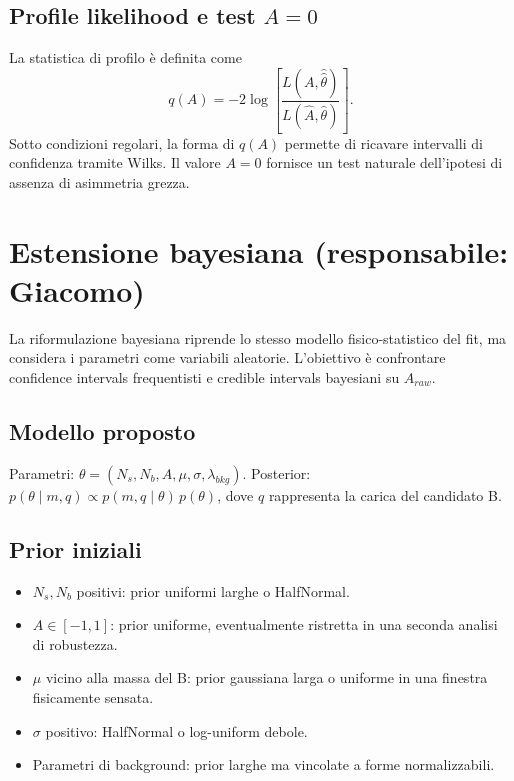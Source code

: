 \documentclass[11pt,a4paper]{article}
\begin{document}
\subsection*{Profile likelihood e test $A=0$}
La statistica di profilo è definita come
\[
q(A) = -2\log\!\left[\frac{L(A, \hat{\hat\theta})}{L(\hat A, \hat\theta)}\right].
\]
Sotto condizioni regolari, la forma di $q(A)$ permette di ricavare intervalli di confidenza tramite Wilks. Il valore $A=0$ fornisce un test naturale dell'ipotesi di assenza di asimmetria grezza.

\section{Estensione bayesiana \textnormal{\small(responsabile: Giacomo)}}

La riformulazione bayesiana riprende lo stesso modello fisico-statistico del fit, ma considera i parametri come variabili aleatorie. L'obiettivo è confrontare confidence intervals frequentisti e credible intervals bayesiani su $A_{raw}$.

\subsection*{Modello proposto}
Parametri: $\theta = (N_s, N_b, A, \mu, \sigma, \lambda_{bkg})$. Posterior: $p(\theta \mid m, q) \propto p(m, q \mid \theta)\, p(\theta)$, dove $q$ rappresenta la carica del candidato B.

\subsection*{Prior iniziali}
\begin{itemize}[leftmargin=1.4em]
    \item $N_s, N_b$ positivi: prior uniformi larghe o HalfNormal.
    \item $A \in [-1,1]$: prior uniforme, eventualmente ristretta in una seconda analisi di robustezza.
    \item $\mu$ vicino alla massa del B: prior gaussiana larga o uniforme in una finestra fisicamente sensata.
    \item $\sigma$ positivo: HalfNormal o log-uniform debole.
    \item Parametri di background: prior larghe ma vincolate a forme normalizzabili.
\end{itemize}
\end{document}
